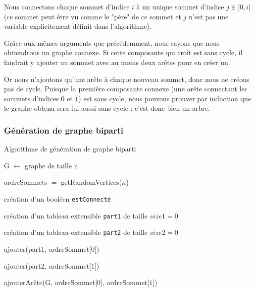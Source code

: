 \documentclass[a4paper,10pt]{article}
\begin{document}
Nous connectons chaque sommet d'indice $i$ à un unique sommet d'indice $j\in[0, i[$ (ce sommet peut être vu comme le "père" de ce sommet et $j$ n'est pas une variable explicitement définit dans l'algorithme).

Grâce aux mêmes arguments que précédemment, nous savons que nous obtiendrons un graphe connexe. Si cette composante qui croît est sans cycle, il faudrait y ajouter un sommet avec au moins deux arêtes pour en créer un.

Or nous n'ajoutons qu'une arête à chaque nouveau sommet, donc nous ne créons pas de cycle. Puisque la première composante connexe (une arête connectant les sommets d'indices $0$ et $1$) est sans cycle, nous pouvons prouver par induction que le graphe obtenu sera lui aussi sans cycle : c'est donc bien un arbre.

\subsubsection{Génération de graphe biparti}

\begin{algorithm}[H]
\caption{Algorithme de génération de graphe biparti}
\BlankLine
G $\leftarrow$ graphe de taille n

ordreSommets $=$ getRandomVertices($n$)

création d'un booléen \texttt{estConnecté}

création d'un tableau extensible \texttt{part1} de taille $size1=0$

création d'un tableau extensible \texttt{part2} de taille $size2=0$

\bigskip
ajouter(part1, ordreSommet[$0$])

ajouter(part2, ordreSommet[$1$])

ajouterArête(G, ordreSommet[$0$], ordreSommet[$1$])



\end{algorithm}
\bigskip
\end{document}
